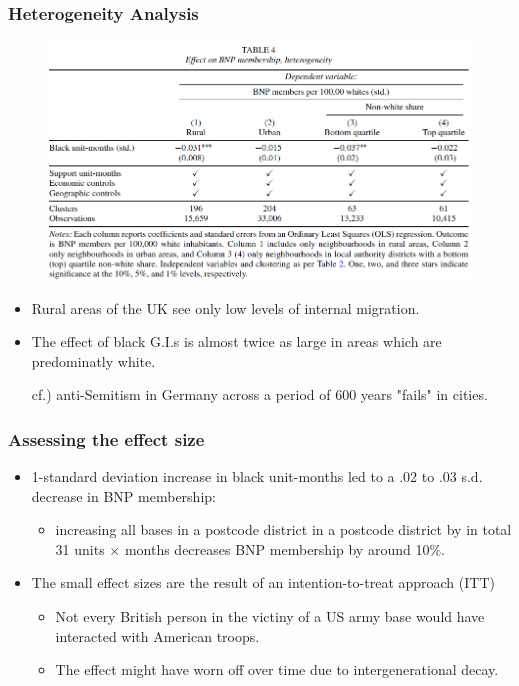 \documentclass[dvipdfmx,11pt]{beamer}
\begin{document}
\begin{frame}\frametitle{Heterogeneity Analysis}
  \begin{figure}
    \centering
    \includegraphics[scale = .6]{os1027tanji/T4}
  \end{figure}
  \begin{itemize}
    \scriptsize
    \item Rural areas of the UK see only low levels of internal migration.
    \item The effect of black G.I.s is almost twice as large in areas which are predominatly white.
    \item[cf.)] anti-Semitism in Germany across a period of 600 years "fails" in cities.
  \end{itemize}
\end{frame}

\begin{frame}\frametitle{Assessing the effect size}
  \begin{itemize}
    \item 1-standard deviation increase in black unit-months led to a .02 to .03 s.d. decrease in BNP membership:
    \begin{itemize}
      \item increasing all bases in a postcode district in a postcode district by in total 31 units $\times$ months decreases BNP membership by around 10\%.
    \end{itemize}
    \item The small effect sizes are the result of an intention-to-treat approach (ITT)
    \begin{itemize}
      \item Not every British person in the victiny of a US army base would have interacted with American troops.
      \item The effect might have worn off over time due to intergenerational decay.
    \end{itemize}
  \end{itemize}
\end{frame}
\end{document}
